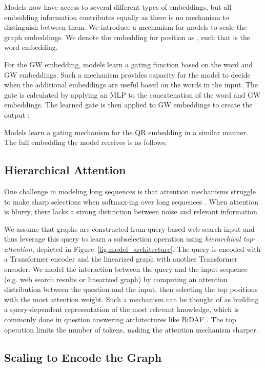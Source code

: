 \documentclass[11pt,a4paper]{article}
\begin{document}
Models now have access to several different types of embeddings, but all embedding information contributes equally as there is no mechanism to distinguish between them. We introduce a mechanism for models to scale the graph embeddings. We denote the embedding for position  as  , such that  is the word embedding.

For the GW embedding, models learn a gating function  based on the word and GW embeddings. Such a mechanism provides capacity for the model to decide when the additional embeddings are useful based on the words in the input. The gate is calculated by applying an MLP  to the concatenation of the word and GW embeddings. The learned gate is then applied to GW embeddings to create the output :


Models learn a gating mechanism for the QR embedding in a similar manner. The full embedding the model receives is as follows:


\subsection{Hierarchical Attention} One challenge in modeling long sequences is that attention mechanisms struggle to make sharp selections when softmax-ing over long sequences \cite{fan2018hierarchical}. When attention is blurry, there lacks a strong distinction between noise and relevant information.

We assume that graphs are constructed from query-based web search input and thus leverage this query to learn a subselection operation using \textit{hierarchical top- attention}, depicted in Figure~\ref{fig:model_architecture}. The query is encoded with a Transformer encoder and the linearized graph with another Transformer encoder. We model the interaction between the query and the input sequence (e.g. web search results or linearized graph) by computing an attention distribution between the question and the input, then selecting the top  positions with the most attention weight. Such a mechanism can be thought of as building a query-dependent representation of the most relevant knowledge, which is commonly done in question answering architectures like BiDAF \cite{seo2017bidirectional}. The top  operation limits the number of tokens, making the attention mechanism sharper. 

\subsection{Scaling to Encode the Graph} 
\end{document}
